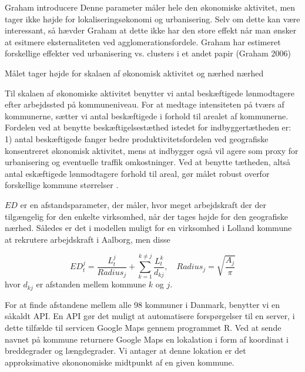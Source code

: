 \documentclass[a4paper, 12pt]{article}
\begin{document}
Graham introducere Denne parameter måler hele den økonomiske aktivitet, men tager ikke højde for lokaliseringsøkonomi og urbanisering. Selv om dette kan være interessant, så hævder Graham at dette ikke har den store effekt når man ønsker at esitmere eksternaliteten ved agglomerationsfordele.
Graham har estimeret forskellige effekter ved urbanisering vs. clusters i et andet papir (Graham 2006) \newline

Målet tager højde for skalaen af økonomisk aktivitet og nærhed nærhed \newline

Til skalaen af økonomiske aktivitet benytter vi antal beskæftigede lønmodtagere efter arbejdssted på kommuneniveau. For at medtage intensiteten på tværs af kommunerne, sætter vi antal beskæftigede i forhold til arealet af kommunerne. Fordelen ved at benytte beskæftigelsestæthed istedet for indbyggertætheden er: 1) antal beskæftigede fanger bedre produktivitetsfordelen ved geografiske konsentreret økonomisk aktivitet, mens at indbygger også vil agere som proxy for urbanisering og eventuelle traffik omkostninger. Ved at benytte tætheden, altså antal eskæftigede lønmodtagere forhold til areal, gør målet robust overfor forskellige kommune størrelser \cite[pp. 335.]{melo2009meta}.\newline

  

$ED$ er en afstandsparameter, der måler, hvor meget arbejdskraft der der tilgængelig for den enkelte virksomhed, når der tages højde for den geografiske nærhed. Således er det i modellen muligt for en virksomhed i Lolland kommune at rekrutere arbejdskraft i Aalborg, men disse 

\begin{equation}
   ED^j_t = \frac{L^j_t}{Radius_j} + \sum_{k=1}^{k \neq j} \frac{L^k_t}{d_{kj}}, \quad Radius_j = \sqrt{\frac{A_j}{\pi}}
 \end{equation} 
 hvor $d_{kj}$ er afstanden mellem kommune $k$ og $j$. \newline
 
 
For at finde afstandene mellem alle 98 kommuner i Danmark, benytter vi en såkaldt API. En API gør det muligt at automatisere forspørgelser til en server, i dette tilfælde til servicen Google Maps gennem programmet \textsf{R}. Ved at sende navnet på kommune returnere Google Maps en lokalation i form af koordinat i breddegrader og længdegrader. Vi antager at denne lokation er det approksimative økononomiske midtpunkt af en given kommune. \newline
\end{document}
